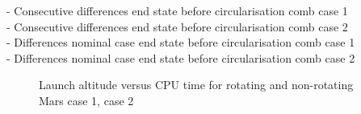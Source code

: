 %
%
%
- Consecutive differences end state before circularisation comb case 1 \\
- Consecutive differences end state before circularisation comb case 2 \\
- Differences nominal case end state before circularisation comb case 1 \\
- Differences nominal case end state before circularisation comb case 2 \\



\begin{figure}[H]
\centering
{} 
\caption{Launch altitude versus CPU time for rotating and non-rotating Mars \protect{} case 1,  \protect{} case 2 } 
\label{fig:launchAltitudeVsCPUcase1combined} 
\end{figure} 

